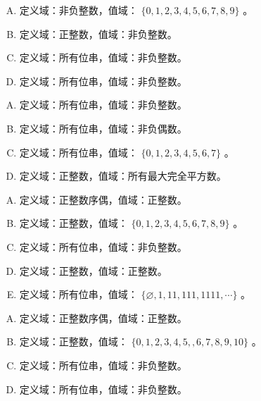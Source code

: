 {{        %
        \begin{practices}
            \begin{enumerate}[A.]
                \item 定义域：非负整数，值域： $\{0, 1, 2, 3, 4, 5, 6, 7, 8, 9\}$ 。
                \item 定义域：正整数，值域：非负整数。
                \item 定义域：所有位串，值域：非负整数。
                \item 定义域：所有位串，值域：非负整数。
            \end{enumerate}
        \end{practices}

        \begin{practices}
            \begin{enumerate}[A.]
                \item 定义域：所有位串，值域：非负整数。
                \item 定义域：所有位串，值域：非负偶数。
                \item 定义域：所有位串，值域： $\{0, 1, 2, 3, 4, 5, 6, 7\}$ 。
                \item 定义域：正整数，值域：所有最大完全平方数。
            \end{enumerate}
        \end{practices}

        \begin{practices}
            \begin{enumerate}[A.]
                \item 定义域：正整数序偶，值域：正整数。
                \item 定义域：正整数，值域： $\{0, 1, 2, 3, 4, 5, 6, 7, 8, 9\}$ 。
                \item 定义域：所有位串，值域：非负整数。
                \item 定义域：正整数，值域：正整数。
                \item 定义域：所有位串，值域： $\{\varnothing, 1, 11, 111, 1111, \cdots\}$ 。
            \end{enumerate}
        \end{practices}

        \begin{practices}
            \begin{enumerate}[A.]
                \item 定义域：正整数序偶，值域：正整数。
                \item 定义域：正整数，值域： $\{0, 1, 2, 3, 4, 5, ,6 ,7, 8, 9, 10\}$ 。
                \item 定义域：所有位串，值域：非负整数。
                \item 定义域：所有位串，值域：非负整数。
            \end{enumerate}
        \end{practices}

}}
